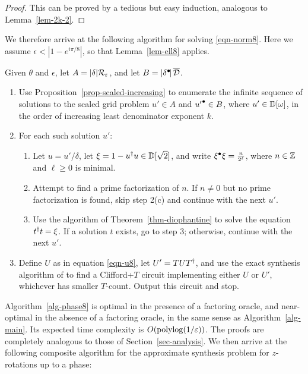 \documentclass{article}
\begin{document}
\begin{proof}
  This can be proved by a tedious but easy induction, analogous to
  Lemma~\ref{lem-2k-2}.
\end{proof}

We therefore arrive at the following algorithm for solving
{\eqref{eqn-norm8}}. Here we assume $\epsilon < |1-e^{i\pi/8}|$, so
that Lemma~\ref{lem-ell8} applies.

\begin{algorithm}\label{alg-phase8}
  Given $\theta$ and $\epsilon$, let $A=|\delta|{\cal R}_{\varepsilon}$, and let
  $B=|\delta^{\bullet}\!|\,\overline {\cal D}$.
  \begin{enumerate}
  \item[1.] Use Proposition~\ref{prop-scaled-increasing} to enumerate
    the infinite sequence of solutions to the scaled grid problem
    $u'\in A$ and ${u'}^{\bullet}\in B$, where $u'\in{\mathbb{D}}[\omega]$, in the order
    of increasing least denominator exponent $k$. 
  \item[2.] For each such solution $u'$:
    \begin{enumerate}
    \item[(a)] Let $u=u'/\delta$, let $\xi=1 - u^{\dagger} u\in{\mathbb{D}}[\sqrt2]$, and write
      $\xi^{\bullet}\xi=\frac{n}{2^\ell}$, where $n\in\mathbb{Z}$ and $\ell\geq 0$
      is minimal.
    \item[(b)] Attempt to find a prime factorization of
      $n$. If $n\neq 0$ but no prime factorization is found, skip step
      2(c) and continue with the next $u'$.
    \item[(c)] Use the algorithm of Theorem~\ref{thm-diophantine} to
      solve the equation $t^{\dagger} t = \xi$. If a solution $t$ exists,
      go to step 3; otherwise, continue with the next $u'$.
    \end{enumerate}
  \item[3.] Define $U$ as in equation {\eqref{eqn-u8}}, let
      $U'=TUT^{\dagger}$, and use the exact synthesis algorithm of
      {\cite{Kliuchnikov-etal}} to find a Clifford+$T$ circuit
      implementing either $U$ or $U'$, whichever has smaller
      $T$-count. Output this circuit and stop.
  \end{enumerate}
\end{algorithm}

Algorithm~\ref{alg-phase8} is optimal in the presence of a factoring
oracle, and near-optimal in the absence of a factoring oracle, in the
same sense as Algorithm~\ref{alg-main}. Its expected time complexity
is $O(\mathop{\rm polylog}\nolimits(1/\varepsilon))$. The proofs are completely analogous to
those of Section~\ref{sec-analysis}. We then arrive at the following
composite algorithm for the approximate synthesis problem for
$z$-rotations up to a phase:
\end{document}
